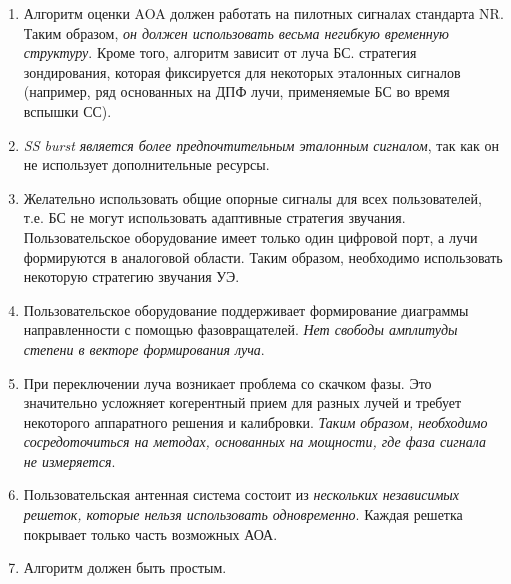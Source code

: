 \begin{enumerate}
    \item Алгоритм оценки AOA должен работать на пилотных сигналах стандарта NR. Таким образом, \textit{он
              должен использовать весьма негибкую временную структуру}. Кроме того, алгоритм зависит от луча БС.
          стратегия зондирования, которая фиксируется для некоторых эталонных сигналов (например, ряд основанных на ДПФ
          лучи, применяемые БС во время вспышки СС).
    \item \textit{SS burst является более предпочтительным эталонным сигналом}, так как он не использует дополнительные ресурсы.

    \item Желательно использовать общие опорные сигналы для всех пользователей, т.е. БС не могут использовать адаптивные
          стратегия звучания.
          Пользовательское оборудование имеет только один цифровой порт, а лучи формируются в аналоговой области. Таким образом,
          необходимо использовать некоторую стратегию звучания УЭ.

    \item Пользовательское оборудование поддерживает формирование диаграммы направленности с помощью фазовращателей. \textit{Нет свободы амплитуды
              степени в векторе формирования луча}.

    \item При переключении луча возникает проблема со скачком фазы. Это значительно
          усложняет когерентный прием для разных лучей и требует некоторого аппаратного решения
          и калибровки. \textit{Таким образом, необходимо сосредоточиться на методах, основанных на мощности, где фаза сигнала
              не измеряется}.

    \item Пользовательская антенная система состоит из \textit{нескольких независимых решеток, которые нельзя использовать
              одновременно}. Каждая решетка покрывает только часть возможных АОА.

    \item Алгоритм должен быть простым.
\end{enumerate}

